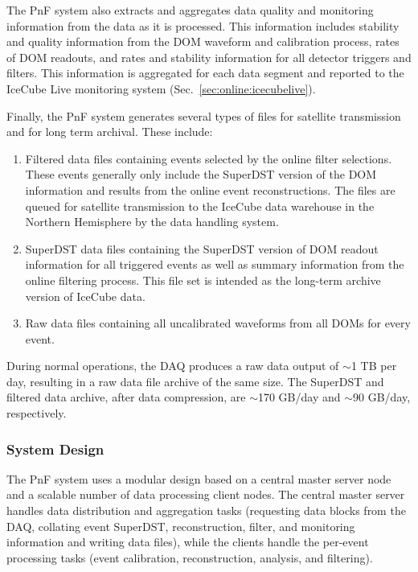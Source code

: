 The PnF system also extracts and aggregates data quality and monitoring
information from the data as it is processed.  This information includes
stability and quality information from the DOM waveform and calibration
process, rates of DOM readouts, and rates and 
stability information for all detector triggers and filters.  This
information is aggregated for each data segment and reported to the IceCube
Live monitoring system (Sec.~\ref{sec:online:icecubelive}).

Finally, the PnF system generates several types of files for satellite
transmission and for long term archival. These
include:   
\begin{enumerate}
\item Filtered data files containing events selected by the online filter
  selections.  These events generally only include the SuperDST version of
  the DOM information and results from the online event reconstructions.
  The files are queued for satellite transmission to the IceCube data
  warehouse in the Northern Hemisphere by the data handling system.
\item SuperDST data files containing the SuperDST version of DOM readout
  information for all triggered events as well as summary information from
  the online filtering process.  This file set is intended as the long-term
  archive version of IceCube data.
\item Raw data files containing all uncalibrated waveforms from all DOMs for
  every event.  %
\end{enumerate}

During normal operations, the DAQ produces a raw data output of
$\sim$1 TB per day, resulting in a raw data file 
archive of the same size.  The SuperDST and filtered data archive, after
data compression, are $\sim$170 GB/day and $\sim$90 GB/day, respectively.

\subsubsection{System Design}

The PnF system uses a modular design based on
a central master server node and a scalable number of data processing client
nodes.  The central master server handles data distribution and
aggregation tasks (requesting data blocks from the DAQ, collating event
SuperDST, reconstruction, filter, and monitoring information and writing
data files), while the clients handle the per-event processing
tasks (event calibration, reconstruction, analysis, and filtering).

